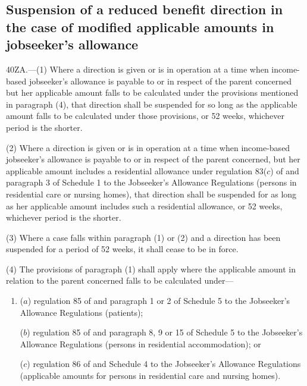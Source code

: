 \documentclass[a4paper,12pt]{article}
\begin{document}

\subsection[40ZA. Suspension of a reduced benefit direction in the case of modified applicable amounts in jobseeker’s allowance]{Suspension of a reduced benefit direction in the case of modified applicable amounts in jobseeker’s allowance}

40ZA.—(1) Where a direction is given or is in operation at a time when income-based jobseeker’s allowance is payable to or in respect of the parent concerned but her applicable amount falls to be calculated under the provisions mentioned in paragraph (4), that direction shall be suspended for so long as the applicable amount falls to be calculated under those provisions, or 52 weeks, whichever period is the shorter.

(2) Where a direction is given or is in operation at a time when income-based jobseeker’s allowance is payable to or in respect of the parent concerned, but her applicable amount includes a residential allowance under regulation 83($c$) of and paragraph 3 of Schedule 1 to the Jobseeker’s Allowance Regulations (persons in residential care or nursing homes), that direction shall be suspended for as long as her applicable amount includes such a residential allowance, or 52 weeks, whichever period is the shorter.

(3) Where a case falls within paragraph (1) or (2) and a direction has been suspended for a period of 52 weeks, it shall cease to be in force.

(4) The provisions of paragraph (1) shall apply where the applicable amount in relation to the parent concerned falls to be calculated under—
\begin{enumerate}\item[]
($a$) regulation 85 of and paragraph 1 or 2 of Schedule 5 to the Jobseeker’s Allowance Regulations (patients);

($b$) regulation 85 of and paragraph 8, 9 or 15 of Schedule 5 to the Jobseeker’s Allowance Regulations (persons in residential accommodation); or

($c$) regulation 86 of and Schedule 4 to the Jobseeker’s Allowance Regulations (applicable amounts for persons in residential care and nursing homes).
\end{enumerate}
\end{document}
